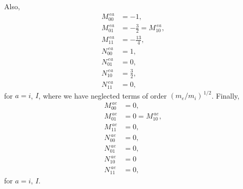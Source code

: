 \documentclass[12pt]{article}
\begin{document}
Also,
\begin{align}
M^{\,ea}_{00} &= -1,\\[0.5ex]
M^{\,ea}_{01}&= -\frac{3}{2}= M^{\,ea}_{10},\\[0.5ex]
M^{\,ea}_{11}& = -\frac{13}{4},\\[0.5ex]
N^{\,ea}_{00} &= 1,\\[0.5ex]
N^{\,ea}_{01}&= 0,\\[0.5ex]
N^{\,ea}_{10}&=\frac{3}{2},\\[0.5ex]
N^{\,ea}_{11}& =0,
\end{align}
for $a=i$, $I$, where we have neglected terms of order $(m_e/m_i)^{\,1/2}$. Finally,
\begin{align}
M^{\,ae}_{00} &= 0,\\[0.5ex]
M^{\,ae}_{01}&=0= M^{\,ae}_{10},\\[0.5ex]
M^{\,ae}_{11}& = 0,\\[0.5ex]
N^{\,ae}_{00} &= 0,\\[0.5ex]
N^{\,ae}_{01}&= 0,\\[0.5ex]
N^{\,ae}_{10}&=0\\[0.5ex]
N^{\,ae}_{11}& =0,
\end{align}
for $a=i$, $I$. 
\end{document}

